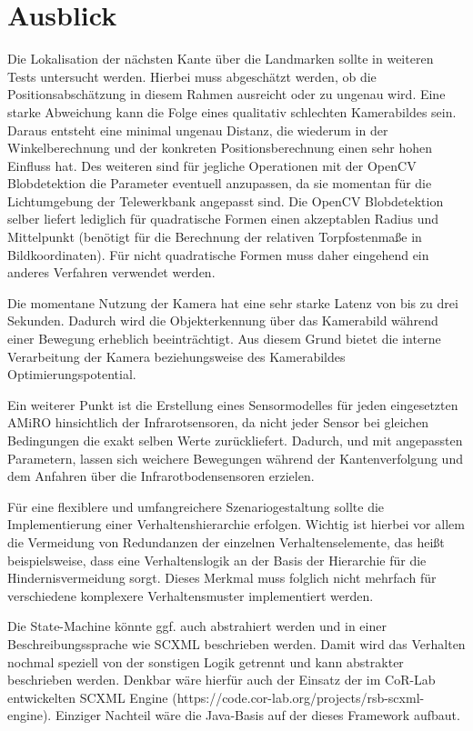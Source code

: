\chapter{Ausblick} \label{kap:ausblick}

Die Lokalisation der nächsten Kante über die Landmarken sollte in weiteren Tests untersucht werden. Hierbei muss abgeschätzt werden, ob die Positionsabschätzung in diesem Rahmen ausreicht oder zu ungenau wird. Eine starke Abweichung kann die Folge eines qualitativ schlechten Kamerabildes sein. Daraus entsteht eine minimal ungenau Distanz, die wiederum in der Winkelberechnung und der konkreten Positionsberechnung einen sehr hohen Einfluss hat. Des weiteren sind für jegliche Operationen mit der OpenCV Blobdetektion die Parameter eventuell anzupassen, da sie momentan für die Lichtumgebung der Telewerkbank angepasst sind. Die OpenCV Blobdetektion selber liefert lediglich für quadratische Formen einen akzeptablen Radius und Mittelpunkt (benötigt für die Berechnung der relativen Torpfostenmaße in Bildkoordinaten). Für nicht quadratische Formen muss daher eingehend ein anderes Verfahren verwendet werden.

Die momentane Nutzung der Kamera hat eine sehr starke Latenz von bis zu drei Sekunden. Dadurch wird die Objekterkennung über das Kamerabild während einer Bewegung erheblich beeinträchtigt. Aus diesem Grund bietet die interne Verarbeitung der Kamera beziehungsweise des Kamerabildes Optimierungspotential. %

Ein weiterer Punkt ist die Erstellung eines Sensormodelles für jeden eingesetzten AMiRO hinsichtlich der Infrarotsensoren, da nicht jeder Sensor bei gleichen Bedingungen die exakt selben Werte zurückliefert. Dadurch, und mit angepassten Parametern, lassen sich weichere Bewegungen während der Kantenverfolgung und dem Anfahren über die Infrarotbodensensoren erzielen.

Für eine flexiblere und umfangreichere Szenariogestaltung sollte die Implementierung einer Verhaltenshierarchie erfolgen. Wichtig ist hierbei vor allem die Vermeidung von Redundanzen der einzelnen Verhaltenselemente, das heißt beispielsweise, dass eine Verhaltenslogik an der Basis der Hierarchie für die Hindernisvermeidung sorgt. Dieses Merkmal muss folglich nicht mehrfach für verschiedene komplexere Verhaltensmuster implementiert werden.

Die State-Machine könnte ggf. auch abstrahiert werden und in einer Beschreibungssprache wie SCXML beschrieben werden. Damit wird das Verhalten nochmal speziell von der sonstigen Logik getrennt und kann abstrakter beschrieben werden. Denkbar wäre hierfür auch der Einsatz der im CoR-Lab entwickelten SCXML Engine (https://code.cor-lab.org/projects/rsb-scxml-engine). Einziger Nachteil wäre die Java-Basis auf der dieses Framework aufbaut.

